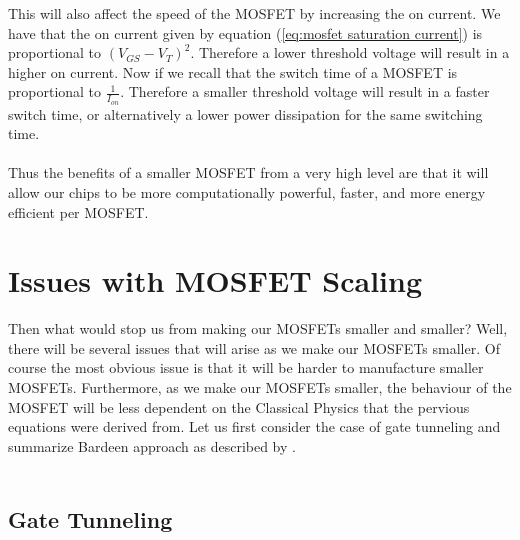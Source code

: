 \documentclass[
  reprint,
  amsmath,amssymb,
  aps
]{revtex4-1}
\begin{document}
This will also affect the speed of the MOSFET by increasing the on current. We have that the on current given by 
equation (\ref{eq:mosfet saturation current}) is proportional to $(V_{GS}-V_{T})^{2}$. Therefore a lower threshold voltage will result in 
a higher on current. Now if we recall that the switch time of a MOSFET is proportional to $\frac{1}{I_{on}}$. Therefore 
a smaller threshold voltage will result in a faster switch time, or alternatively a lower power dissipation for the 
same switching time.\\\\
Thus the benefits of a smaller MOSFET from a very high level are that it will allow our chips to be more computationally powerful, 
faster, and more energy efficient per MOSFET. 
\section*{Issues with MOSFET Scaling}
Then what would stop us from making our MOSFETs smaller and smaller? Well, there will be several issues that will 
arise as we make our MOSFETs smaller. Of course the most obvious issue is that it will be harder to manufacture smaller MOSFETs. Furthermore, 
as we make our MOSFETs smaller, the behaviour of the MOSFET will be less dependent on the Classical Physics that the pervious 
equations were derived from. Let us first consider the case of gate tunneling and summarize Bardeen approach as 
described by \cite{bardeen_tunneling}.\\\\
\subsection*{Gate Tunneling}



\end{document}
